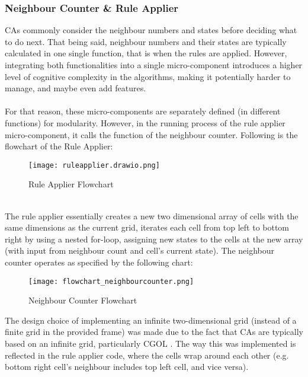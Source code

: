 \subsubsection{Neighbour Counter \& Rule Applier} \label{ncrc}
CAs commonly consider the neighbour numbers and states before deciding what to do next. That being said, neighbour numbers and their states are typically calculated in one single function, that is when the rules are applied. However, integrating both functionalities into a single micro-component introduces a higher level of cognitive complexity in the algorithms, making it potentially harder to manage, and maybe even add features.
\\ \\
For that reason, these micro-components are separately defined (in different functions) for modularity. However, in the running process of the rule applier micro-component, it calls the function of the neighbour counter. Following is the flowchart of the Rule Applier:
\\
\begin{figure}[h]
    \caption{Rule Applier Flowchart}
    \centering
    \texttt{[image: ruleapplier.drawio.png]}
\end{figure}
\\
The rule applier essentially creates a new two dimensional array of cells with the same dimensions as the current grid, iterates each cell from top left to bottom right by using a nested for-loop, assigning new states to the cells at the new array (with input from neighbour count and cell's current state). 
\newpage
\noindent The neighbour counter operates as specified by the following chart:
\begin{figure}[H]
    \caption{Neighbour Counter Flowchart}
    \centering
    \texttt{[image: flowchart\_neighbourcounter.png]}
\end{figure}

\noindent The design choice of implementing an infinite two-dimensional grid (instead of a finite grid in the provided frame) was made due to the fact that CAs are typically based on an infinite grid, particularly CGOL \cite{kier2005modeling}. The way this was implemented is reflected in the rule applier code, where the cells wrap around each other (e.g. bottom right cell's neighbour includes top left cell, and vice versa).
\newpage
